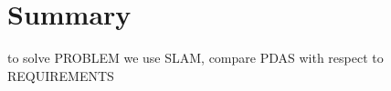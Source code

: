 \documentclass[main.tex]{subfiles}
\begin{document}
\section{Summary}
to solve PROBLEM we use SLAM, compare PDAS with respect to REQUIREMENTS
\end{document}
